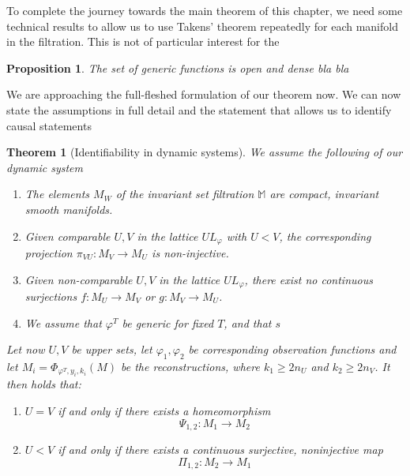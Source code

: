 \documentclass[11pt, a4paper]{memoir}
\theoremstyle{break}
\newtheorem{thm}{Theorem}
\newtheorem{prop}{Proposition}
\theoremstyle{break}
\theoremstyle{nonumberplain}
\begin{document}
To complete the journey towards the main theorem of this chapter, we need some technical results to allow us to use Takens' theorem repeatedly for each manifold in the filtration. This is not of particular interest for the
\begin{prop}
The set of generic functions is open and dense bla bla
\end{prop}
We are approaching the full-fleshed formulation of our theorem now. We can now state the assumptions in full detail and the statement that allows us to identify causal statements
\begin{thm}[Identifiability in dynamic systems]
We assume the following of our dynamic system
\begin{enumerate}[label=(I\arabic*)]
	\item The elements $M_W$ of the invariant set filtration $\mathbb{M}$ are compact, invariant \emph{smooth} manifolds. 
	\item Given comparable $U,V$ in the lattice $UL_\varphi$ with $U<V$, the corresponding projection $\pi_{VU}:M_V\to M_U$ is non-injective.
	\item Given non-comparable $U,V$ in the lattice $UL_\varphi$, there exist no continuous surjections $f:M_U\to M_V$ or $g:M_V\to M_U$.
	\item We assume that $\varphi^T$ be generic for fixed $T$, and that $s$
\end{enumerate}
Let now $U,V$ be upper sets, let $\varphi_1,\varphi_2$ be corresponding observation functions and let $M_i=\Phi_{\varphi^T,y_i,k_i}(M)$ be the reconstructions, where $k_1\geqslant 2n_U$ and $k_2\geqslant 2n_V$. It then holds that:
\begin{enumerate}[label=\roman*.]
	\item $U=V$ if and only if there exists a homeomorphism
	$$\Psi_{1,2}:M_1\to M_2$$
	\item $U<V$ if and only if there exists a continuous surjective, noninjective map
	$$\Pi_{1,2}:M_2\to M_1$$ 
\end{enumerate}
\end{thm}
\end{document}
